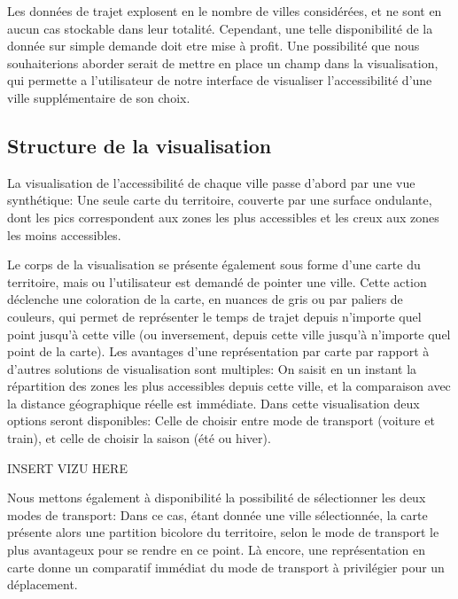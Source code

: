 \documentclass{vgtc}                          %
\begin{document}
Les données de trajet explosent en le nombre de villes considérées, et ne sont en aucun cas stockable dans leur totalité. Cependant, une telle disponibilité de la donnée sur simple demande doit etre mise à profit. Une possibilité que nous souhaiterions aborder serait de mettre en place un champ dans la visualisation, qui permette a l'utilisateur de notre interface de visualiser l'accessibilité d'une ville supplémentaire de son choix.

\subsection{Structure de la visualisation}

\vspace{0.3cm}

La visualisation de l'accessibilité de chaque ville passe d'abord par une vue synthétique: Une seule carte du territoire, couverte par une surface ondulante, dont les pics correspondent aux zones les plus accessibles et les creux aux zones les moins accessibles. 

Le corps de la visualisation se présente également sous forme d'une carte du territoire, mais ou l'utilisateur est demandé de pointer une ville. Cette action déclenche une coloration de la carte, en nuances de gris ou par paliers de couleurs, qui permet de représenter le temps de trajet depuis n'importe quel point jusqu'à cette ville (ou inversement, depuis cette ville jusqu'à n'importe quel point de la carte). Les avantages d'une représentation par carte par rapport à d'autres solutions de visualisation sont multiples: On saisit en un instant la répartition des zones les plus accessibles depuis cette ville, et la comparaison avec la distance géographique réelle est immédiate. Dans cette visualisation deux options seront disponibles: Celle de choisir entre mode de transport (voiture et train), et celle de choisir la saison (été ou hiver). 

\begin{center}
INSERT VIZU HERE
\end{center}


Nous mettons également à disponibilité la possibilité de sélectionner les deux modes de transport: Dans ce cas, étant donnée une ville sélectionnée, la carte présente alors une partition bicolore du territoire, selon le mode de transport le plus avantageux pour se rendre en ce point. Là encore, une représentation en carte donne un comparatif immédiat du mode de transport à privilégier pour un déplacement.
\end{document}
